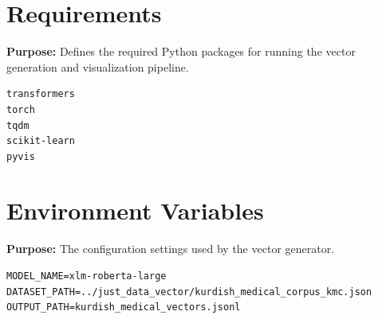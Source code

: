 \documentclass[11pt]{article}
\begin{document}
\section{Requirements} \label{sec:requirements}
\textbf{Purpose:} Defines the required Python packages for running the vector generation and visualization pipeline.

\begin{lstlisting}[style=bashcode, caption={requirements.txt}]
transformers
torch
tqdm
scikit-learn
pyvis
\end{lstlisting}

\section{Environment Variables} \label{sec:env}
\textbf{Purpose:} The configuration settings used by the vector generator.

\begin{lstlisting}[style=bashcode, caption={.env}]
MODEL_NAME=xlm-roberta-large
DATASET_PATH=../just_data_vector/kurdish_medical_corpus_kmc.json
OUTPUT_PATH=kurdish_medical_vectors.jsonl
\end{lstlisting}
\end{document}
